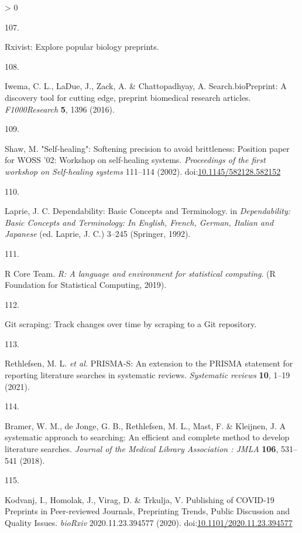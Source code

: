 \documentclass[a4paper, twoside]{templates/ociamthesis}
\newlength{\cslhangindent}
\newlength{\csllabelwidth}
\newenvironment{CSLReferences}[3] %
 {%
  \setlength{\parindent}{0pt}
  \ifodd #1 \everypar{\setlength{\hangindent}{\cslhangindent}}\ignorespaces\fi
  \ifnum #2 > 0
  \setlength{\parskip}{#2\baselineskip}
  \fi
 }%
 {}
\newcommand{\CSLLeftMargin}[1]{\parbox[t]{\maxof{\widthof{#1}}{\csllabelwidth}}{#1}}
\newcommand{\CSLRightInline}[1]{\parbox[t]{\linewidth - \csllabelwidth}{#1}}
\begin{document}
\begin{CSLReferences}{0}{0}
\leavevmode\hypertarget{ref-zotero-15027}{}%
\CSLLeftMargin{107. }
\CSLRightInline{Rxivist: {Explore} popular biology preprints.}

\leavevmode\hypertarget{ref-iwema2016}{}%
\CSLLeftMargin{108. }
\CSLRightInline{Iwema, C. L., LaDue, J., Zack, A. \& Chattopadhyay, A. Search.{bioPreprint}: A discovery tool for cutting edge, preprint biomedical research articles. \emph{F1000Research} \textbf{5}, 1396 (2016).}

\leavevmode\hypertarget{ref-shaw2002}{}%
\CSLLeftMargin{109. }
\CSLRightInline{Shaw, M. "{Self}-healing": Softening precision to avoid brittleness: Position paper for {WOSS} '02: Workshop on self-healing systems. \emph{Proceedings of the first workshop on Self-healing systems} 111--114 (2002). doi:\href{https://doi.org/10.1145/582128.582152}{10.1145/582128.582152}}

\leavevmode\hypertarget{ref-laprie1992}{}%
\CSLLeftMargin{110. }
\CSLRightInline{Laprie, J. C. Dependability: {Basic Concepts} and {Terminology}. in \emph{Dependability: {Basic Concepts} and {Terminology}: {In English}, {French}, {German}, {Italian} and {Japanese}} (ed. Laprie, J. C.) 3--245 ({Springer}, 1992).}

\leavevmode\hypertarget{ref-rcoreteam2019}{}%
\CSLLeftMargin{111. }
\CSLRightInline{R Core Team. \emph{R: {A} language and environment for statistical computing}. ({R Foundation for Statistical Computing}, 2019).}

\leavevmode\hypertarget{ref-zotero-15031}{}%
\CSLLeftMargin{112. }
\CSLRightInline{Git scraping: Track changes over time by scraping to a {Git} repository.}

\leavevmode\hypertarget{ref-rethlefsen2021prisma}{}%
\CSLLeftMargin{113. }
\CSLRightInline{Rethlefsen, M. L. \emph{et al.} {PRISMA}-{S}: An extension to the {PRISMA} statement for reporting literature searches in systematic reviews. \emph{Systematic reviews} \textbf{10}, 1--19 (2021).}

\leavevmode\hypertarget{ref-bramer2018}{}%
\CSLLeftMargin{114. }
\CSLRightInline{Bramer, W. M., de Jonge, G. B., Rethlefsen, M. L., Mast, F. \& Kleijnen, J. A systematic approach to searching: An efficient and complete method to develop literature searches. \emph{Journal of the Medical Library Association : JMLA} \textbf{106}, 531--541 (2018).}

\leavevmode\hypertarget{ref-kodvanj2020}{}%
\CSLLeftMargin{115. }
\CSLRightInline{Kodvanj, I., Homolak, J., Virag, D. \& Trkulja, V. Publishing of {COVID}-19 {Preprints} in {Peer}-reviewed {Journals}, {Preprinting Trends}, {Public Discussion} and {Quality Issues}. \emph{bioRxiv} 2020.11.23.394577 (2020). doi:\href{https://doi.org/10.1101/2020.11.23.394577}{10.1101/2020.11.23.394577}}


\end{CSLReferences}
\end{document}
